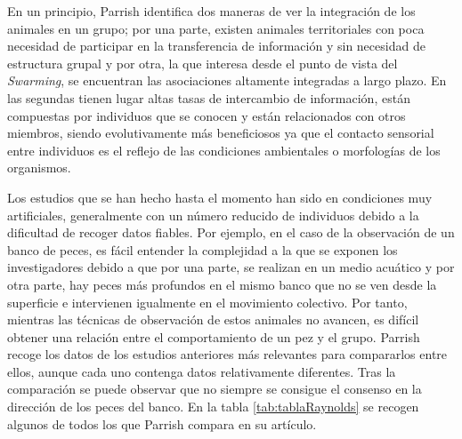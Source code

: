 En un principio, Parrish identifica dos maneras de ver la integración de los animales en un grupo; por una parte, existen animales territoriales con poca necesidad de participar en la transferencia de información y sin necesidad de estructura grupal y por otra, la que interesa desde el punto de vista del \textit{Swarming}, se encuentran las asociaciones altamente integradas a largo plazo. En las segundas tienen lugar altas tasas de intercambio de información, están compuestas por individuos que se conocen y están relacionados con otros miembros, siendo evolutivamente más beneficiosos ya que el contacto sensorial entre individuos es el reflejo de las condiciones ambientales o morfologías de los organismos.

Los estudios que se han hecho hasta el momento han sido en condiciones muy artificiales, generalmente con un número reducido de individuos debido a la dificultad de recoger datos fiables. Por ejemplo, en el caso de la observación de un banco de peces, es fácil entender la complejidad a la que se exponen los investigadores debido a que por una parte, se realizan en un medio acuático y por otra parte, hay peces más profundos en el mismo banco que no se ven desde la superficie e intervienen igualmente en el movimiento colectivo. Por tanto, mientras las técnicas de observación de estos animales no avancen, es difícil obtener una relación entre el comportamiento de un pez y el grupo. Parrish recoge los datos de los estudios anteriores más relevantes para compararlos entre ellos, aunque cada uno contenga datos relativamente diferentes. Tras la comparación se puede observar que no siempre se consigue el consenso en la dirección de los peces del banco. En la tabla \ref{tab:tablaRaynolds} se recogen algunos de todos los que Parrish compara en su artículo.

